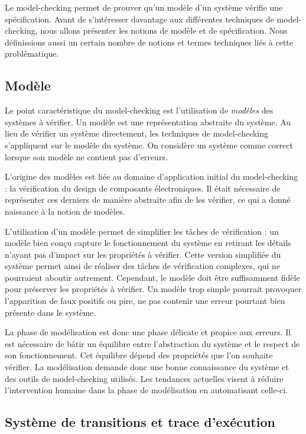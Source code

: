 Le model-checking permet de prouver qu'un modèle d'un système vérifie une
spécification. Avant de s'intéresser davantage aux différentes techniques de
model-checking, nous allons présenter les notions de modèle et de spécification.
Nous définissions aussi un certain nombre de notions et termes techniques liés à
cette problématique.

\subsection{Modèle}

Le point caractéristique du model-checking est l'utilisation de
\emph{modèles} des systèmes à vérifier. Un modèle est une représentation
abstraite du système. Au lieu de vérifier un système directement, les techniques
de model-checking s'appliquent sur le modèle du système. On considère un
système comme correct lorsque son modèle ne contient pas d'erreurs.

L'origine des modèles est liée au domaine d'application initial du
model-checking : la vérification du design de composants électroniques. Il
était nécessaire de représenter ces derniers de manière abstraite afin de les
vérifier, ce qui a donné naissance à la notion de modèles.

L'utilisation d'un modèle permet de simplifier les tâches de vérification : un
modèle bien conçu capture le fonctionnement du système en retirant les détails
n'ayant pas d'impact sur les propriétés à vérifier. Cette version simplifiée du
système permet ainsi de réaliser des tâches de vérification complexes, qui ne
pourraient aboutir autrement. Cependant, le modèle doit être suffisamment fidèle
pour préserver les propriétés à vérifier. Un modèle trop simple pourrait
provoquer l'apparition de faux positifs ou pire, ne pas contenir une erreur
pourtant bien présente dans le système.

La phase de modélisation est donc une phase délicate et propice aux erreurs. Il
est nécessaire de bâtir un équilibre entre l'abstraction du système et le
respect de son fonctionnement. Cet équilibre dépend des propriétés que l'on
souhaite vérifier. La modélisation demande donc une bonne connaissance
du système et des outils de model-checking utilisés. Les tendances actuelles
visent à réduire l'intervention humaine dans la phase de modélisation en
automatisant celle-ci.

\subsection{Système de transitions et trace d'exécution}

